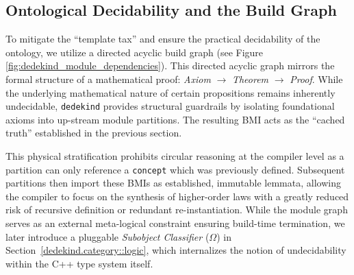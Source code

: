 \documentclass[11pt, a4paper]{report}
\begin{document}
\subsection{Ontological Decidability and the Build Graph}
To mitigate the ``template tax'' and ensure the practical decidability of the ontology, we utilize a directed acyclic build graph (see Figure \ref{fig:dedekind_module_dependencies}).
This directed acyclic graph mirrors the formal structure of a mathematical proof: \textit{Axiom} $\rightarrow$ \textit{Theorem} $\rightarrow$ \textit{Proof}.
While the underlying mathematical nature of certain propositions remains inherently undecidable, \texttt{dedekind} provides structural guardrails by isolating foundational axioms into up-stream module partitions.
The resulting BMI acts as the ``cached truth'' established in the previous section.

This physical stratification prohibits circular reasoning at the compiler level as a partition can only reference a \texttt{concept} which was previously defined.
Subsequent partitions then import these BMIs as established, immutable lemmata, allowing the compiler to focus on the synthesis of higher-order laws with a greatly reduced risk of recursive definition or redundant re-instantiation.
While the module graph serves as an external meta-logical constraint ensuring build-time termination, we later introduce a pluggable \textit{Subobject Classifier} ($\Omega$) in Section~\ref{dedekind.category::logic}, which internalizes the notion of undecidability within the C++ type system itself.
\end{document}
